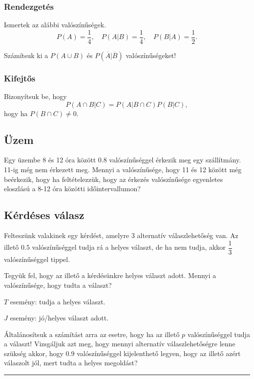 \documentclass[a4paper]{article}
\begin{document}
\subsubsection{Rendezgetés}

Ismertek az alábbi valószínűségek.
\[
P(A) = \dfrac{1}{4}, \quad
P(A|B) = \dfrac{1}{4}, \quad
P(B|A) = \dfrac{1}{2}.
\]

Számítsuk ki a $P(A \cup B)$ és $P(\overline{A}|\overline{B})$ valószínűségeket!

\subsubsection{Kifejtős}

Bizonyítsuk be, hogy
\[
P(A \cap B|C) = P(A|B \cap C)P(B|C),
\]
hogy ha $P(B \cap C) \neq 0$.

\subsection{Üzem}

Egy üzembe 8 és 12 óra között 0.8 valószínűséggel érkezik meg egy szállítmány.
11-ig még nem érkezett meg.
Mennyi a valószínűsége, hogy 11 és 12 között még beérkezik, hogy ha feltételezzük, hogy az érkezés valószínűsége egyenletes eloszlású a 8-12 óra közötti időintervallumon?

\subsection{Kérdéses válasz}

Felteszünk valakinek egy kérdést, amelyre 3 alternatív válaszlehetőség van.
Az illető $0.5$ valószínűséggel tudja rá a helyes választ, de ha nem tudja, akkor $\dfrac{1}{3}$ valószínűséggel tippel.

Tegyük fel, hogy az illető a kérdésünkre helyes választ adott.
Mennyi a valószínűsége, hogy tudta a választ?

$T$ esemény: tudja a helyes választ.

$J$ esemény: jó/helyes választ adott.

Általánosítsuk a számítást arra az esetre, hogy ha az illető $p$ valószínűséggel tudja a választ!
Vizsgáljuk azt meg, hogy mennyi alternatív válaszlehetőségre lenne szükség akkor, hogy $0.9$ valószínűséggel kijelenthető legyen, hogy az illető azért válaszolt jól, mert tudta a helyes megoldást?

\hrule

\medskip
\end{document}
